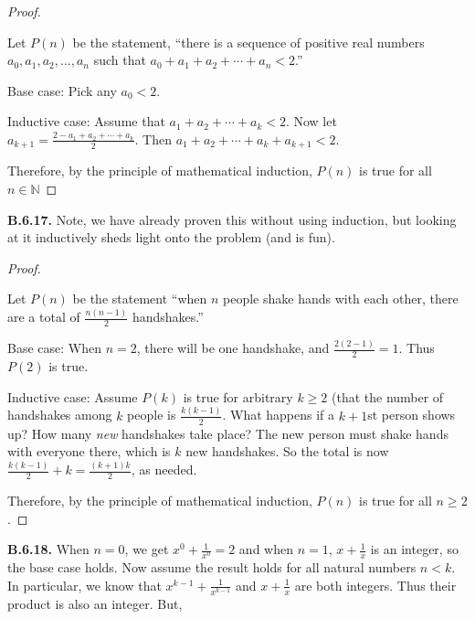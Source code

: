 \documentclass[10pt,]{book}
\theoremstyle{plain}
\theoremstyle{definition}
\theoremstyle{definition}
\theoremstyle{definition}
\theoremstyle{definition}
\numberwithin{equation}{chapter}
\def\N{\mathbb N}
\newcommand{\lt}{<}
\begin{document}
\begin{proof}\hypertarget{proof-54}{}
\hypertarget{p-2314}{}%
Let \(P(n)\) be the statement, ``there is a sequence of positive real numbers \(a_0, a_1, a_2, \ldots, a_n\) such that \(a_0 + a_1 + a_2 + \cdots + a_n \lt  2\).''%
\par
\hypertarget{p-2315}{}%
Base case: Pick any \(a_0 \lt  2\).%
\par
\hypertarget{p-2316}{}%
Inductive case: Assume that \(a_1 + a_2 + \cdots + a_k \lt  2\). Now let \(a_{k+1} = \frac{2- a_1 + a_2 + \cdots + a_k}{2}\). Then \(a_1 + a_2 + \cdots +a_k + a_{k+1} \lt  2\).%
\par
\hypertarget{p-2317}{}%
Therefore, by the principle of mathematical induction, \(P(n)\) is true for all \(n \in \N\)%
\end{proof}
\par\smallskip
\noindent\textbf{B.6.17.} \hypertarget{p-2319}{}%
Note, we have already proven this without using induction, but looking at it inductively sheds light onto the problem (and is fun).%
\begin{proof}\hypertarget{proof-55}{}
\hypertarget{p-2320}{}%
Let \(P(n)\) be the statement ``when \(n\) people shake hands with each other, there are a total of \(\frac{n(n-1)}{2}\) handshakes.''%
\par
\hypertarget{p-2321}{}%
Base case: When \(n=2\), there will be one handshake, and \(\frac{2(2-1)}{2} = 1\).  Thus \(P(2)\) is true.%
\par
\hypertarget{p-2322}{}%
Inductive case: Assume \(P(k)\) is true for arbitrary \(k\ge 2\) (that the number of handshakes among \(k\) people is \(\frac{k(k-1)}{2}\).  What happens if a \(k+1\)st person shows up?  How many \emph{new} handshakes take place?  The new person must shake hands with everyone there, which is \(k\) new  handshakes.  So the total is now \(\frac{k(k-1)}{2} + k = \frac{(k+1)k}{2}\), as needed.%
\par
\hypertarget{p-2323}{}%
Therefore, by the principle of mathematical induction, \(P(n)\) is true for all \(n \ge 2\).%
\end{proof}
\par\smallskip
\noindent\textbf{B.6.18.} \hypertarget{p-2325}{}%
When \(n = 0\), we get \(x^0 +\frac{1}{x^0} = 2\) and when \(n = 1\), \(x + \frac{1}{x}\) is an integer, so the base case holds. Now assume the result holds for all natural numbers \(n \lt  k\). In particular, we know that \(x^{k-1} + \frac{1}{x^{k-1}}\) and \(x + \frac{1}{x}\) are both integers. Thus their product is also an integer. But,%
\end{document}
